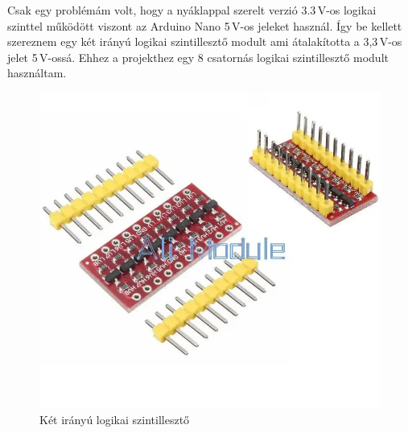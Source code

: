 \documentclass[]{thesis-ekf}
\theoremstyle{definition}
\theoremstyle{remark}
\begin{document}
Csak egy problémám volt, hogy a nyáklappal szerelt verzió 3.3\,V-os logikai szinttel működött viszont az Arduino Nano 5\,V-os jeleket használ. Így be kellett szereznem egy két irányú logikai szintillesztő\cite{szintilleszto} modult ami átalakította a 3,3\,V-os  jelet 5\,V-ossá. Ehhez a projekthez egy 8 csatornás logikai szintillesztő modult használtam.

\begin{figure}[th!]
	\centering
	\includegraphics[width=0.4\linewidth]{szintilleszto}
	\caption[Logikai szintillesztő]{Két irányú logikai szintillesztő}
	\label{fig:szintilleszto}
\end{figure}
\end{document}
